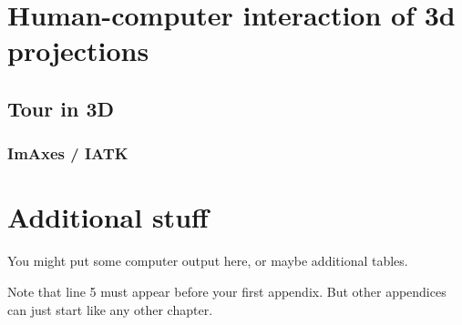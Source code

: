 \documentclass{monashthesis}
\begin{document}
\chapter{Human-computer interaction of 3d
projections}\label{ch:hci_3dproj}

\section{Tour in 3D}\label{tour-in-3d}

\subsection{ImAxes / IATK}\label{imaxes-iatk}

\appendix

\chapter{Additional stuff}\label{additional-stuff}

You might put some computer output here, or maybe additional tables.

Note that line 5 must appear before your first appendix. But other
appendices can just start like any other chapter.

\printbibliography[heading=bibintoc]
\end{document}
